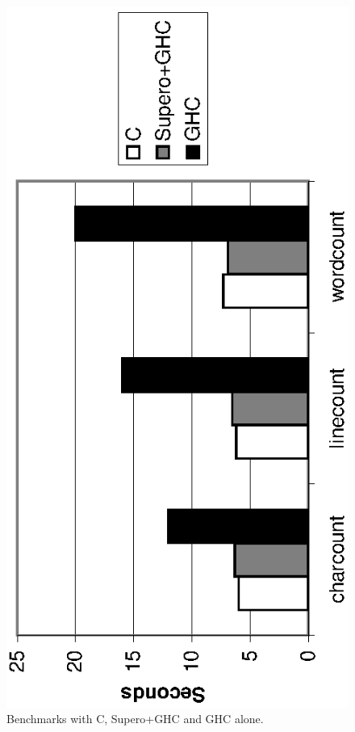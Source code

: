 \begin{figure}
\begin{center}
\includegraphics[scale=0.75,angle=270]{graphics/supero-wc.eps}
\end{center}
\caption{Benchmarks with C, Supero+GHC and GHC alone.}
\label{fig:c_results}
\end{figure}

